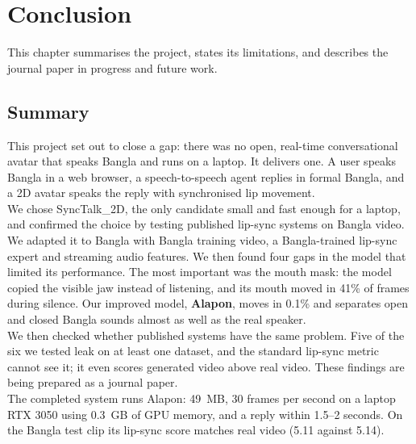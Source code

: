\chapter{Conclusion}

This chapter summarises the project, states its limitations, and describes the journal paper in progress and future work.

\section{Summary}

This project set out to close a gap: there was no open, real-time conversational avatar that speaks Bangla and runs on a laptop. It delivers one. A user speaks Bangla in a web browser, a speech-to-speech agent replies in formal Bangla, and a 2D avatar speaks the reply with synchronised lip movement.\\

\noindent
We chose SyncTalk\_2D, the only candidate small and fast enough for a laptop, and confirmed the choice by testing published lip-sync systems on Bangla video. We adapted it to Bangla with Bangla training video, a Bangla-trained lip-sync expert and streaming audio features. We then found four gaps in the model that limited its performance. The most important was the mouth mask: the model copied the visible jaw instead of listening, and its mouth moved in 41\% of frames during silence. Our improved model, \textbf{Alapon}, moves in 0.1\% and separates open and closed Bangla sounds almost as well as the real speaker.\\

\noindent
We then checked whether published systems have the same problem. Five of the six we tested leak on at least one dataset, and the standard lip-sync metric cannot see it; it even scores generated video above real video. These findings are being prepared as a journal paper.\\

\noindent
The completed system runs Alapon: 49~MB, 30 frames per second on a laptop RTX 3050 using 0.3~GB of GPU memory, and a reply within 1.5--2 seconds. On the Bangla test clip its lip-sync score matches real video (5.11 against 5.14).

